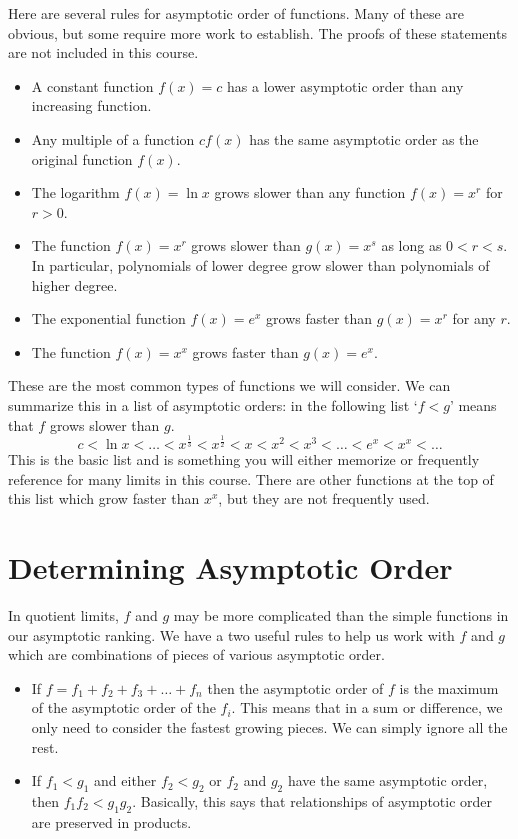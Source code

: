 \documentclass[fleqn]{report}
\begin{document}
Here are several rules for asymptotic order of functions. Many
of these are obvious, but some require more work to establish.
The proofs of these statements are not included in this
course.
\begin{itemize}
\item A constant function $f(x) = c$ has a lower asymptotic
order than any increasing function.
\item Any multiple of a function $c f(x)$ has the same
asymptotic order as the original function $f(x)$. 
\item The logarithm $f(x) = \ln x$ grows slower than any
function $f(x) = x^r$ for $r > 0$. 
\item The function $f(x) = x^r$ grows slower than $g(x) = x^s$
as long as $0 < r< s$. In particular, polynomials of lower
degree grow slower than polynomials of higher degree.
\item The exponential function $f(x) = e^x$ grows faster than
$g(x) = x^r$ for any $r$.
\item The function $f(x) = x^x$ grows faster than $g(x) = e^x$.
\end{itemize}
These are the most common types of functions we will consider.
We can summarize this in a list of asymptotic orders: in the
following list `$f<g$' means that $f$ grows slower
than $g$. 
\begin{equation*}
c < \ln x < \ldots < x^{\frac{1}{3}} < x^{\frac{1}{2}} < x < x^2
< x^3 < \ldots < e^x < x^x < \ldots
\end{equation*}
This is the basic list and is something you will either
memorize or frequently reference for many limits in this course.
There are other functions at the top of this list which grow
faster than $x^x$, but they are not frequently used.

\section{Determining Asymptotic Order}
\label{determining-asymptotic-order}

In quotient limits, $f$ and $g$ may be more complicated than
the simple functions in our asymptotic ranking. We have a
two useful rules to help us work with $f$ and $g$ which are
combinations of pieces of various asymptotic order.
\begin{itemize}
\item If $f = f_1 + f_2 + f_3 + \ldots + f_n$ then the
asymptotic order of $f$ is the maximum of the asymptotic order
of the $f_i$. This means that in a sum or difference, we only
need to consider the fastest growing pieces. We can simply
ignore all the rest.
\item If $f_1 < g_1$ and either $f_2 < g_2$ or $f_2$ and $g_2$
have the same asymptotic order, then $f_1 f_2 < g_1 g_2$.
Basically, this says that relationships of asymptotic order are
preserved in products.
\end{itemize}
\end{document}
